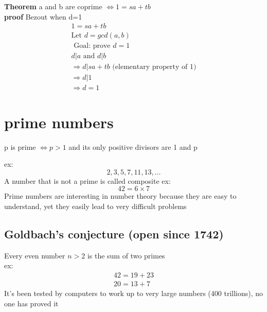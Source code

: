 \documentclass{article}
\begin{document}
\textbf{Theorem} a and b are coprime $\iff 1 = sa+tb$ \\
\textbf{proof} Bezout when d=1
\begin{gather*}
    1=sa+tb \\
    \text{Let } d = gcd(a,b) \\
    \text{ Goal: prove } d = 1 \\
    d|a \text{ and } d|b\\
    \Rightarrow d|sa + tb \text{ (elementary property of 1)}\\
    \Rightarrow d|1\\
    \Rightarrow d = 1
\end{gather*}

\section{prime numbers}
p is prime $\iff p > 1$ and its only positive divisors are 1 and p

ex: \[
    2,3,5,7,11,13,\dots
\]
A number that is not a prime is called composite
ex: \[
    42 = 6 \times 7
\]
Prime numbers are interesting in number theory because they are easy to understand, yet they easily lead to very difficult problems

\subsection{Goldbach's conjecture (open since 1742)}
Every even number $n>2$ is the sum of two primes\\
ex:
\begin{gather*}
    42 = 19 + 23\\
    20 = 13+7
\end{gather*}
It's been tested by computers to work up to very large numbers (400 trillions),
no one has proved it
\end{document}
